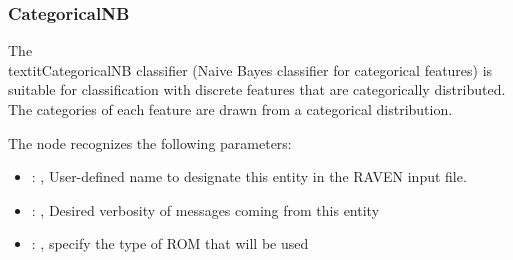 \subsubsection{CategoricalNB}
  The \\textit{CategoricalNB} classifier (Naive Bayes classifier for categorical features)
  is suitable for classification with discrete features that are categorically distributed.
  The categories of each feature are drawn from a categorical distribution.

  The  node recognizes the following parameters:
    \begin{itemize}
      \item {}: , 
        User-defined name to designate this entity in the RAVEN input file.
      \item {}: , 
        Desired verbosity of messages coming from this entity
      \item {}: , 
        specify the type of ROM that will be used
  \end{itemize}

